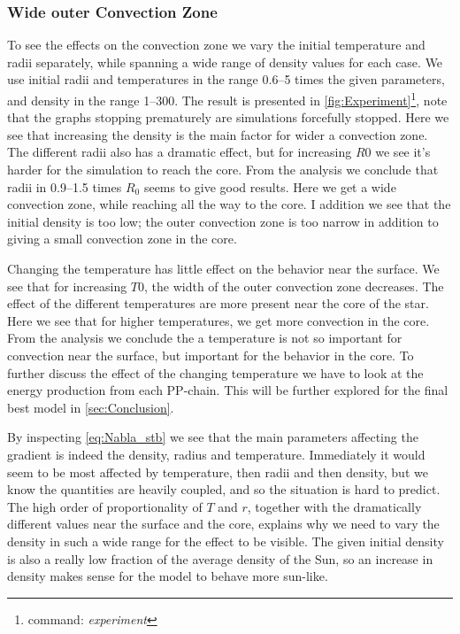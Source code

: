 \documentclass[11pt,a4paper,twocolumn,titlepage]{article}
\begin{document}

\subsubsection{Wide outer Convection Zone}\label{subsubsec:Method/Wide_convection}
To see the effects on the convection zone we vary the initial temperature and radii separately, while spanning a wide range of density values for each case. We use initial radii and temperatures in the range \numrange{0.6}{5} times the given parameters, and density in the range \numrange{1}{300}. The result is presented in \cref{fig:Experiment}\footnote{command: \textit{experiment}}, note that the graphs stopping prematurely are simulations forcefully stopped. Here we see that increasing the density is the main factor for wider a convection zone. The different radii also has a dramatic effect, but for increasing $R0$ we see it's harder for the simulation to reach the core. From the analysis we conclude that radii in \numrange{0.9}{1.5} times $R_0$ seems to give good results. Here we get a wide convection zone, while reaching all the way to the core. I addition we see that the initial density is too low; the outer convection zone is too narrow in addition to giving a small convection zone in the core. 

Changing the temperature has little effect on the behavior near the surface. We see that for increasing $T0$, the width of the outer convection zone decreases. The effect of the different temperatures are more present near the core of the star. Here we see that for higher temperatures, we get more convection in the core. From the analysis we conclude the a temperature is not so important for convection near the surface, but important for the behavior in the core. To further discuss the effect of the changing temperature we have to look at the energy production from each PP-chain. This will be further explored for the final best model in \cref{sec:Conclusion}.

By inspecting \cref{eq:Nabla_stb} we see that the main parameters affecting the gradient is indeed the density, radius and temperature. Immediately it would seem to be most affected by temperature, then radii and then density, but we know the quantities are heavily coupled, and so the situation is hard to predict. The high order of proportionality of $T$ and $r$, together with the dramatically different values near the surface and the core, explains why we need to vary the density in such a wide range for the effect to be visible. The given initial density is also a really low fraction of the average density of the Sun, so an increase in density makes sense for the model to behave more sun-like.
\end{document}
